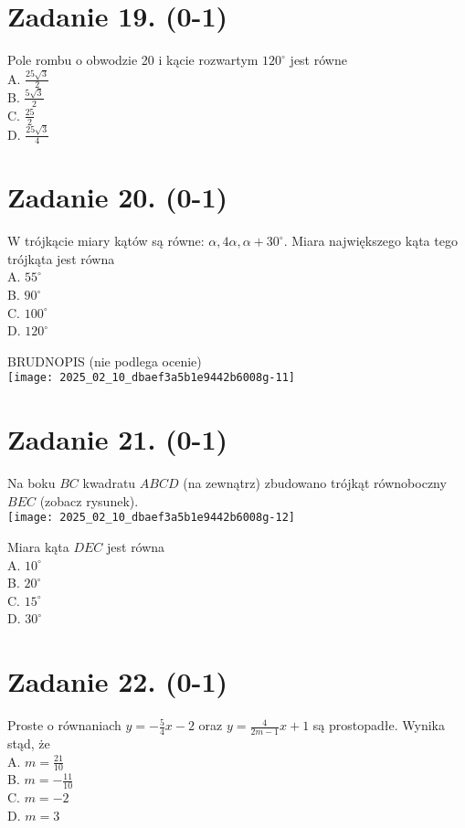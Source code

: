 \documentclass[10pt]{article}
\begin{document}
\section*{Zadanie 19. (0-1)}
Pole rombu o obwodzie 20 i kącie rozwartym \(120^{\circ}\) jest równe\\
A. \(\frac{25 \sqrt{3}}{2}\)\\
B. \(\frac{5 \sqrt{3}}{2}\)\\
C. \(\frac{25}{2}\)\\
D. \(\frac{25 \sqrt{3}}{4}\)

\section*{Zadanie 20. (0-1)}
W trójkącie miary kątów są równe: \(\alpha, 4 \alpha, \alpha+30^{\circ}\). Miara największego kąta tego trójkąta jest równa\\
A. \(55^{\circ}\)\\
B. \(90^{\circ}\)\\
C. \(100^{\circ}\)\\
D. \(120^{\circ}\)

BRUDNOPIS (nie podlega ocenie)\\
\texttt{[image: 2025\_02\_10\_dbaef3a5b1e9442b6008g-11]}

\section*{Zadanie 21. (0-1)}
Na boku \(B C\) kwadratu \(A B C D\) (na zewnątrz) zbudowano trójkąt równoboczny \(B E C\) (zobacz rysunek).\\
\texttt{[image: 2025\_02\_10\_dbaef3a5b1e9442b6008g-12]}

Miara kąta \(D E C\) jest równa\\
A. \(10^{\circ}\)\\
B. \(20^{\circ}\)\\
C. \(15^{\circ}\)\\
D. \(30^{\circ}\)

\section*{Zadanie 22. (0-1)}
Proste o równaniach \(y=-\frac{5}{4} x-2\) oraz \(y=\frac{4}{2 m-1} x+1\) są prostopadłe. Wynika stąd, że\\
A. \(m=\frac{21}{10}\)\\
B. \(m=-\frac{11}{10}\)\\
C. \(m=-2\)\\
D. \(m=3\)
\end{document}
